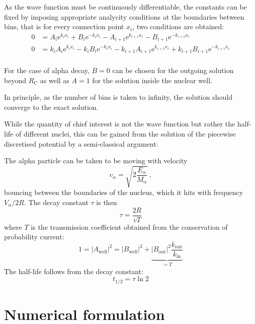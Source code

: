 \documentclass[a4paper,DIV=12,english]{scrartcl}
\begin{document}
As the wave function must be continuously differentiable, the constants can be fixed by imposing appropriate analycity conditions at the boundaries between bins, that is for every connection point $x_i$, two conditions are obtained:
\begin{align}
    0 &= A_i \text{e}^{k_ix_i} + B_i \text{e}^{-k_ix_i} - A_{i+1} \text{e}^{k_{i+1}x_i} - B_{i+1} \text{e}^{-k_{i+1}x_i} \\
    0 &= k_iA_i \text{e}^{k_ix_i} - k_i B_i \text{e}^{-k_ix_i} - k_{i+1}A_{i+1} \text{e}^{k_{i+1}x_i} + k_{i+1} B_{i+1} \text{e}^{-k_{i+1}x_i} \\
\end{align}

For the case of alpha decay, $B=0$ can be chosen for the outgoing solution beyond $R_\text{C}$ as well as $A=1$ for the solution inside the nuclear well.

In principle, as the number of bins is taken to infinity, the solution should converge to the exact solution. 

While the quantity of chief interest is not the wave function but rather the half-life of different nuclei, this can be gained from the solution of the piecewise discretised potential by a semi-classical argument:

The alpha particle can be taken to be moving with velocity
\begin{equation}
    v_\alpha = \sqrt{2 \frac{E_\alpha}{M_\alpha} }\,,
\end{equation}
bouncing between the boundaries of the nucleus, which it hits with frequency $V_\alpha / 2R$. The decay constant $\tau$ is then 
\begin{equation}
    \tau = \frac{2R}{v T}
\end{equation}
where $T$ is the transmission coefficient obtained from the conservation of probability current:
\begin{equation}
    1 = |A_\text{well}|^2 = |B_\text{well}|^2 + \underbrace{|B_\text{out}|^2 \frac{k_\text{out}}{k_\text{in}}}_{=T}
\end{equation}
The half-life follows from the decay constant:
\begin{equation}
    t_{1/2} = \tau \ln 2
\end{equation}


\section{Numerical formulation}
\end{document}
